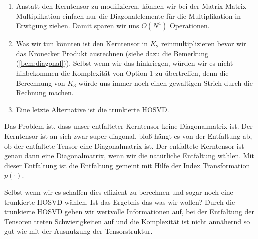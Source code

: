 \begin{enumerate}
\item Anstatt den Kerntensor zu modifizieren, können wir bei der Matrix-Matrix Multiplikation einfach nur die Diagonalelemente für die Multiplikation in Erwägung ziehen. Damit sparen wir uns $O(N^4)$ Operationen.

\item Was wir tun könnten ist den Kerntensor in $K_2$ reinmultiplizieren bevor wir das Kronecker Produkt ausrechnen (siehe dazu die Bemerkung (\ref{bem:diagonal})). Selbst wenn wir das hinkriegen, würden wir es nicht hinbekommen die Komplexität von Option 1 zu übertreffen, denn die Berechnung von $K_3$ würde uns immer noch einen gewaltigen Strich durch die Rechnung machen.

\item Eine letzte Alternative ist die trunkierte HOSVD.

\end{enumerate}

Das Problem ist, dass unser entfalteter Kerntensor keine Diagonalmatrix ist. Der Kerntensor ist an sich zwar super-diagonal, bloß hängt es von der Entfaltung ab, ob der entfaltete Tensor eine Diagonalmatrix ist. 
Der entfaltete Kerntensor ist genau dann eine Diagonalmatrix, wenn wir die natürliche Entfaltung wählen. Mit dieser Entfaltung ist die Entfaltung gemeint mit Hilfe der Index Transformation $p(\cdot)$.

Selbst wenn wir es schaffen dies effizient zu berechnen und sogar noch eine trunkierte HOSVD wählen. Ist das Ergebnis das was wir wollen? Durch die trunkierte HOSVD geben wir wertvolle Informationen auf, bei der Entfaltung der Tensoren treten Schwierigkeiten auf und die Komplexität ist nicht annähernd so gut wie mit der Ausnutzung der Tensorstruktur.

